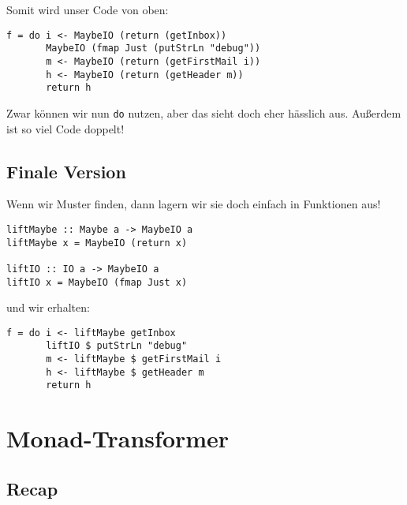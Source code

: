 \documentclass{beamer}
\begin{document}
\begin{frame}[fragile]
Somit wird unser Code von oben: \smallskip

\begin{verbatim}
f = do i <- MaybeIO (return (getInbox))
       MaybeIO (fmap Just (putStrLn "debug"))
       m <- MaybeIO (return (getFirstMail i))
       h <- MaybeIO (return (getHeader m))
       return h
\end{verbatim}
\pause
\bigskip

Zwar können wir nun \texttt{do} nutzen, aber das sieht doch eher hässlich aus. Außerdem ist so viel Code doppelt!
\end{frame}

\subsection{Finale Version}

\begin{frame}[fragile]
Wenn wir Muster finden, dann lagern wir sie doch einfach in Funktionen aus!\bigskip

\begin{verbatim}
liftMaybe :: Maybe a -> MaybeIO a
liftMaybe x = MaybeIO (return x)

liftIO :: IO a -> MaybeIO a
liftIO x = MaybeIO (fmap Just x)
\end{verbatim}
\pause
\smallskip

und wir erhalten:\smallskip

\begin{verbatim}
f = do i <- liftMaybe getInbox
       liftIO $ putStrLn "debug"
       m <- liftMaybe $ getFirstMail i
       h <- liftMaybe $ getHeader m
       return h
\end{verbatim}
\end{frame}

\section{Monad-Transformer}

\subsection{Recap}
\end{document}
